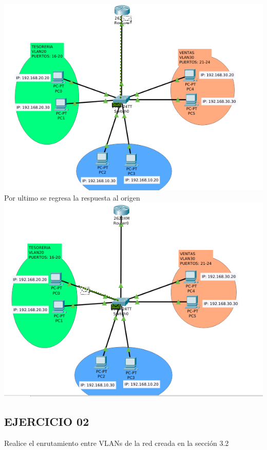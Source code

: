 \includegraphics[scale=0.5]{img/3.png} \\
Por ultimo se regresa la respuesta al origen\\
\includegraphics[scale=0.5]{img/4.png} 
\subsection{EJERCICIO 02}
\begin{definicion}[]{
Realice el enrutamiento entre VLANs de la red creada en la
sección 3.2
}
\end{definicion}

